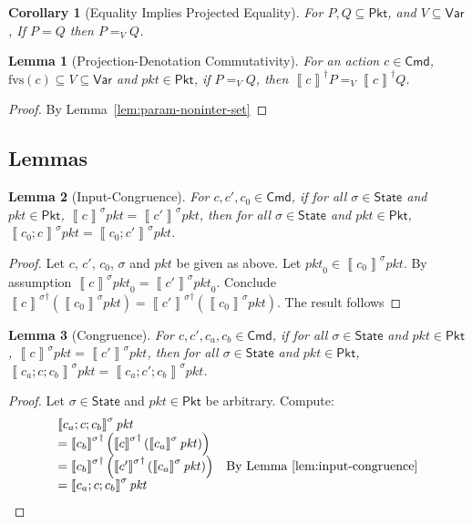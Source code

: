\documentclass{article}
\newcommand{\pkt}{\mathit{pkt}}
\newcommand{\denote}[1]{\left\llbracket#1\right\rrbracket}
\newcommand{\Cmd}{\mathsf{Cmd}}
\newcommand{\Pkt}{\mathsf{Pkt}}
\newcommand{\Var}{\mathsf{Var}}
\newcommand{\State}{\mathsf{State}}
\newcommand{\fvs}{\textrm{fvs}}
\theoremstyle{plain}
\newtheorem{lemma}{Lemma}
\newtheorem{corollary}{Corollary}
\theoremstyle{definition}
\theoremstyle{remark}
\begin{document}
\begin{corollary}[Equality Implies Projected Equality]
  \label{cor:equal-proj}
  For $P,Q \subseteq \Pkt$, and $ V \subseteq \Var$, If $P = Q$ then $P =_V Q$.
\end{corollary}


\begin{lemma}[Projection-Denotation Commutativity]
  \label{lem:proj-den-comm}
  For an action $c \in \Cmd$, $\fvs(c) \subseteq V \subseteq \Var$ and $\pkt \in \Pkt$,
  if $P =_V Q$, then $\denote{c}^\dagger P =_V \denote{c}^\dagger Q$.
\end{lemma}

\begin{proof}
  By Lemma~\ref{lem:param-noninter-set}
\end{proof}





\subsection{Lemmas}

\begin{lemma}[Input-Congruence]
  \label{lem:input-congruence}
  For $c,c',c_0 \in \Cmd$,
  if for all $\sigma \in \State$ and $\pkt \in \Pkt$, $\denote{c}^\sigma \pkt = \denote{c'}^\sigma \pkt$,
  then for all $\sigma \in \State$ and $\pkt \in \Pkt$, $\denote{c_0;c}^\sigma \pkt = \denote{c_0;c'}^\sigma\pkt$.
\end{lemma}
\begin{proof}
  Let $c$, $c'$, $c_0$, $\sigma$ and $\pkt$ be given as above.
  Let $\pkt_0 \in \denote{c_0}^\sigma \pkt$. By assumption $\denote{c}^\sigma \pkt_0 = \denote{c'}^\sigma \pkt_0$.
  Conclude ${\denote{c}^\sigma}^\dagger\left(\denote{c_0}^\sigma\pkt\right) = {\denote{c'}^\sigma}^\dagger\left(\denote{c_0}^\sigma\pkt\right)$. The result follows

\end{proof}


\begin{lemma}[Congruence]
  \label{lem:congruence}
  For $c,c',c_a,c_b \in \Cmd$,
  if for all $\sigma \in \State$ and $\pkt \in \Pkt$, $\denote{c}^\sigma \pkt = \denote{c'}^\sigma \pkt$,
  then for all $\sigma \in \State$ and $\pkt \in \Pkt$, $\denote{c_a;c;c_b}^\sigma \pkt = \denote{c_a;c';c_b}^\sigma\pkt$.
\end{lemma}

\begin{proof}
  Let $\sigma \in \State$ and $\pkt \in \Pkt$ be arbitrary. Compute:
  \[\begin{array}{ll}
  \denote{c_a;c;c_b}^\sigma \pkt \\
  = {\denote{c_b}^\sigma}^\dagger\left({\denote{c}^\sigma}^\dagger\left(\denote{c_a}^\sigma \pkt\right)\right)\\
  = {\denote{c_b}^\sigma}^\dagger\left({\denote{c'}^\sigma}^\dagger\left(\denote{c_a}^\sigma \pkt\right)\right)
  & \text{By Lemma~\ref{lem:input-congruence}}\\
  =\denote{c_a;c;c_b}^\sigma \pkt \\
  \end{array}\]
\end{proof}
\end{document}
